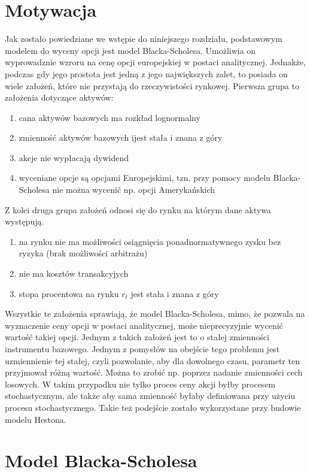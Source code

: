 \documentclass{pracamgr}
\begin{document}
\section{Motywacja} 
Jak zostało powiedziane we wstępie do niniejszego rozdziału, podstawowym modelem do wyceny opcji jest model Blacka-Scholesa.
Umożliwia on wyprowadznie wzroru na cenę opcji europejskiej w postaci analitycznej. Jednakże, podczas gdy jego prostota jest jedną z jego największych zalet, to posiada on wiele założeń, które nie przystają do rzeczywistości rynkowej. Pierwsza grupa to założenia dotyczące aktywów:
\begin{enumerate}
\item cana aktywów bazowych ma rozkład lognormalny
\item zmienność aktywów bazowych ijest stała i znana z góry
\item akcje nie wypłacają dywidend
\item wyceniane opcje są opcjami Europejskimi, tzn. przy pomocy modelu Blacka-Scholesa nie można wycenić np. opcji Amerykańskich
\end{enumerate}
Z kolei druga grupa założeń odnosi się do rynku na którym dane aktywa występują.
\begin{enumerate}
\item na rynku nie ma możliwości osiągnięcia ponadnormatywnego zysku bez ryzyka (brak możliwości arbitrażu)
\item nie ma kosztów transakcyjych
\item stopa procentowa na rynku $r_t$ jest stała i znana z góry 
\end{enumerate}

Wszystkie te założenia sprawiają, że model Blacka-Scholesa, mimo, że pozwala na wyznaczenie ceny opcji w postaci analitycznej, może nieprecyzyjnie wycenić wartość takiej opcji.
Jednym z takich założeń jest to o stałej zmienności instrumentu bazowego. Jednym z pomysłów na obejście tego problemu jest uzmiennienie tej stałej, czyli pozwolanie, aby dla dowolnego czasu, parametr ten przyjmował różną wartość. Można to zrobić np. poprzez nadanie zmienności cech losowych. W takim przypadku nie tylko proces ceny akcji byłby procesem stochastycznym, ale także aby sama zmienność byłaby definiowana przy użyciu procesu stochastycznego. Takie też podejście zostało wykorzystane przy budowie modelu Hestona. \cite{greenwade93}


\section{Model Blacka-Scholesa}
\end{document}

